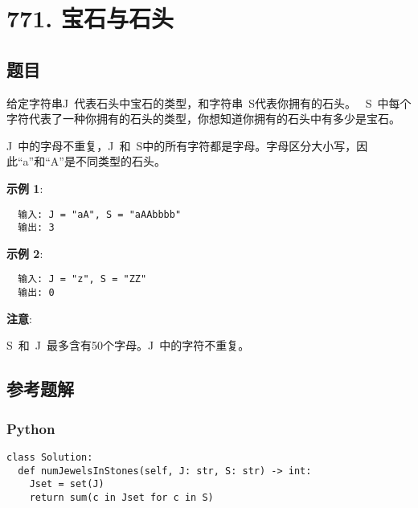 \newpage
\section{771. 宝石与石头}
\label{leetcode:771}

\subsection{题目}

给定字符串J 代表石头中宝石的类型，和字符串 S代表你拥有的石头。 
S 中每个字符代表了一种你拥有的石头的类型，你想知道你拥有的石头中有多少是宝石。

J 中的字母不重复，J 和 S中的所有字符都是字母。字母区分大小写，因此``a''和``A''是不同类型的石头。

\textbf{示例 1}:

\begin{verbatim}
  输入: J = "aA", S = "aAAbbbb"
  输出: 3
\end{verbatim}

\textbf{示例 2}:

\begin{verbatim}
  输入: J = "z", S = "ZZ"
  输出: 0
\end{verbatim}

\textbf{注意}:

S 和 J 最多含有50个字母。J 中的字符不重复。

\subsection{参考题解}

\subsubsection{Python}

\begin{verbatim}
class Solution:
  def numJewelsInStones(self, J: str, S: str) -> int:
    Jset = set(J)
    return sum(c in Jset for c in S)
\end{verbatim}

